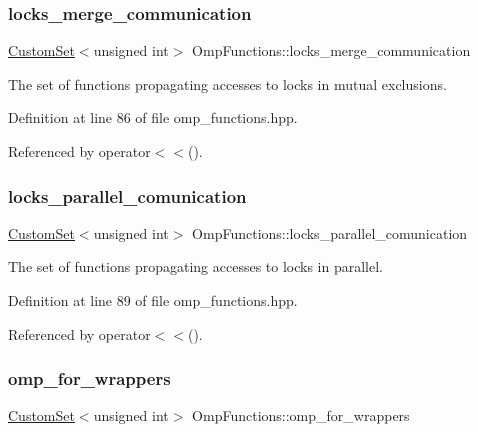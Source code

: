 \subsubsection{\texorpdfstring{locks\+\_\+merge\+\_\+communication}{locks\_merge\_communication}}
{\footnotesize\ttfamily \hyperlink{custom__set_8hpp_a615bc2f42fc38a4bb1790d12c759e86f}{Custom\+Set}$<$unsigned int$>$ Omp\+Functions\+::locks\+\_\+merge\+\_\+communication}



The set of functions propagating accesses to locks in mutual exclusions. 



Definition at line 86 of file omp\+\_\+functions.\+hpp.



Referenced by operator$<$$<$().

\mbox{\label{classOmpFunctions_a25fc0c74066a9a8caf31003fbe9b5413}} 
\subsubsection{\texorpdfstring{locks\+\_\+parallel\+\_\+comunication}{locks\_parallel\_comunication}}
{\footnotesize\ttfamily \hyperlink{custom__set_8hpp_a615bc2f42fc38a4bb1790d12c759e86f}{Custom\+Set}$<$unsigned int$>$ Omp\+Functions\+::locks\+\_\+parallel\+\_\+comunication}



The set of functions propagating accesses to locks in parallel. 



Definition at line 89 of file omp\+\_\+functions.\+hpp.



Referenced by operator$<$$<$().

\mbox{\label{classOmpFunctions_a17e7935fd31530460b887a825beea191}} 
\subsubsection{\texorpdfstring{omp\+\_\+for\+\_\+wrappers}{omp\_for\_wrappers}}
{\footnotesize\ttfamily \hyperlink{custom__set_8hpp_a615bc2f42fc38a4bb1790d12c759e86f}{Custom\+Set}$<$unsigned int$>$ Omp\+Functions\+::omp\+\_\+for\+\_\+wrappers}



